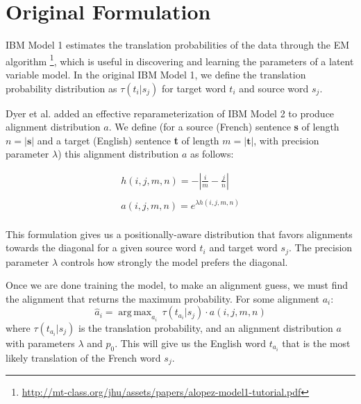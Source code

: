 \documentclass[twoside,twocolumn]{article}
\DeclareMathOperator*{\argmax}{arg\,max}
\begin{document}




\section{Original Formulation}
\label{sec:original-formulation}

IBM Model 1 estimates the translation probabilities of the data through the EM
algorithm
\footnote{\url{http://mt-class.org/jhu/assets/papers/alopez-model1-tutorial.pdf}},
which is useful in discovering and learning the parameters of a
latent variable model.
In the original IBM Model 1, we define the translation probability distribution
as $\tau(t_i|s_j)$ for target word $t_i$ and source word $s_j$.

Dyer et al. \cite{dyer2013simple} added an effective reparameterization
of IBM Model 2 to produce alignment distribution $a$. We define (for a source
(French) sentence \textbf{s} of length $n = |\textbf{s}|$ and a target (English)
sentence \textbf{t} of length $m = |\textbf{t}|$, with precision parameter
$\lambda$) this alignment distribution $a$ as follows:

\begin{equation}
\begin{split}
h(i,j,m,n) = - \left| \frac{i}{m} - \frac{j}{n}\right| \\
\\
a(i,j,m,n) =e^{  \lambda h(i,j,m,n)} \\
\end{split}
\end{equation}

This formulation gives us a positionally-aware distribution that favors alignments
towards the diagonal for a given source word $t_i$ and target word $s_j$. The
precision parameter $\lambda$ controls how strongly the model prefers the
diagonal.

Once we are done training the model, to make an alignment guess, we must find
the alignment that returns the maximum probability. For some alignment $a_i$:
\begin{equation}
\hat{a}_i = \argmax_{a_i} \, \tau(t_{a_i}|s_j) \cdot a(i, j, m, n)
\end{equation}
where $\tau(t_{a_i}|s_j)$ is the translation probability, and an alignment
distribution $a$ with parameters $\lambda$ and $p_0$. This will give us the
English word $t_{a_i}$ that is the most likely translation of the French word
$s_j$.
\end{document}

